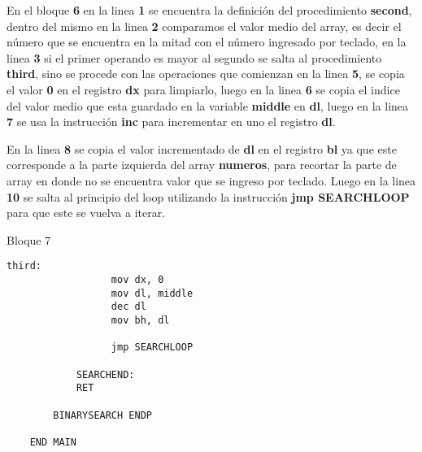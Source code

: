 \documentclass[a4paper,twoside]{article}
\newcommand{\codebordo}[1]{\textcolor{codebordo}{#1}}
\newcommand{\codeblue}[1]{\textcolor{codeblue}{#1}}
\begin{document}
  {\Large En el bloque \textbf{6} en la linea \textbf{1} se encuentra la definición del procedimiento \codeblue{\textbf{second}},
    dentro del mismo en la linea \textbf{2} comparamos el valor medio del array, es decir el número que se encuentra en la mitad
    con el número ingresado por teclado, en la linea \textbf{3} si el primer operando es mayor al segundo se salta al procedimiento 
    \codeblue{\textbf{third}}, sino se procede con las operaciones que comienzan en la linea \textbf{5}, se copia el valor \textbf{0} en el 
    registro \codebordo{\textbf{dx}} para limpiarlo, luego en la linea \textbf{6} se copia el indice del valor medio que esta 
    guardado en la variable \textbf{middle} en \codebordo{\textbf{dl}}, luego en la linea \textbf{7} se usa la instrucción \codeblue{\textbf{inc}}
    para incrementar en uno el registro \codebordo{\textbf{dl}}.
  }
  
  {\Large En la linea \textbf{8} se copia el valor incrementado de \codebordo{\textbf{dl}} en el registro \codebordo{\textbf{bl}}
    ya que este corresponde a la parte izquierda del array \textbf{numeros}, para recortar la parte de array en donde no se encuentra 
    valor que se ingreso por teclado.
    Luego en la linea \textbf{10} se salta al principio del loop utilizando la instrucción \codeblue{\textbf{jmp SEARCHLOOP}} para que 
    este se vuelva a iterar.
  }
  \vspace*{1cm}
  \begin{center}
    {\normalsize Bloque 7}
    \begin{lstlisting}[language=8086]      
              third:
                  mov dx, 0
                  mov dl, middle
                  dec dl
                  mov bh, dl
                  
                  jmp SEARCHLOOP
                      
            SEARCHEND:
            RET

        BINARYSEARCH ENDP

    END MAIN
    \end{lstlisting}
  \end{center} 
  \newpage
\end{document}
